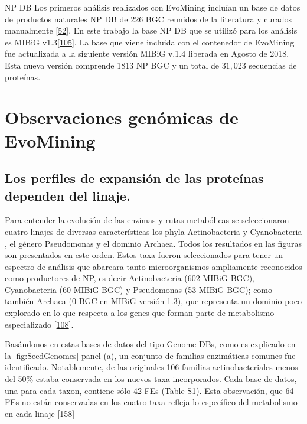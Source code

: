 \documentclass[12pt,twoside]{reedthesis}
\begin{document}
  NP DB Los primeros análisis realizados con EvoMining incluían un base de
  datos de productos naturales NP DB de 226 BGC reunidos de la literatura
  y curados manualmente
  {[}\protect\hyperlink{ref-cruz-morales_phylogenomic_2016}{52}{]}. En
  este trabajo la base NP DB que se utilizó para los análisis es MIBiG
  v1.3{[}\protect\hyperlink{ref-medema_minimum_2015}{105}{]}. La base que
  viene incluida con el contenedor de EvoMining fue actualizada a la
  siguiente versión MIBiG v.1.4 liberada en Agosto de 2018. Esta nueva
  versión comprende 1813 NP BGC y un total de \(31,023\) secuencias de
  proteínas.
  
  \section{Observaciones genómicas de
  EvoMining}\label{observaciones-genomicas-de-evomining}
  
  \subsection{Los perfiles de expansión de las proteínas dependen del
  linaje.}\label{los-perfiles-de-expansion-de-las-proteinas-dependen-del-linaje.}
  
  Para entender la evolución de las enzimas y rutas metabólicas se
  seleccionaron cuatro linajes de diversas características los phyla
  Actinobacteria y Cyanobacteria , el género Pseudomonas y el dominio
  Archaea. Todos los resultados en las figuras son presentados en este
  orden. Estos taxa fueron seleccionados para tener un espectro de
  análisis que abarcara tanto microorganismos ampliamente reconocidos como
  productores de NP, es decir Actinobacteria (602 MIBiG BGC),
  Cyanobacteria (60 MIBiG BGC) y Pseudomonas (53 MIBiG BGC); como también
  Archaea (0 BGC en MIBiG versión 1.3), que representa un dominio poco
  explorado en lo que respecta a los genes que forman parte de metabolismo
  especializado
  {[}\protect\hyperlink{ref-charlesworth_untapped_2015}{108}{]}.
  
  Basándonos en estas bases de datos del tipo Genome DBs, como es
  explicado en la \autoref{fig:SeedGenomes} panel (a), un conjunto de
  familias enzimáticas comunes fue identificado. Notablemente, de las
  originales 106 familias actinobacteriales menos del 50\% estaba
  conservada en los nuevos taxa incorporados. Cada base de datos, una para
  cada taxon, contiene sólo 42 FEs (Table S1). Esta observación, que 64
  FEs no están conservadas en los cuatro taxa refleja lo específico del
  metabolismo en cada linaje
  {[}\protect\hyperlink{ref-jordan_lineage-specific_2001}{158}{]}
  
\end{document}
